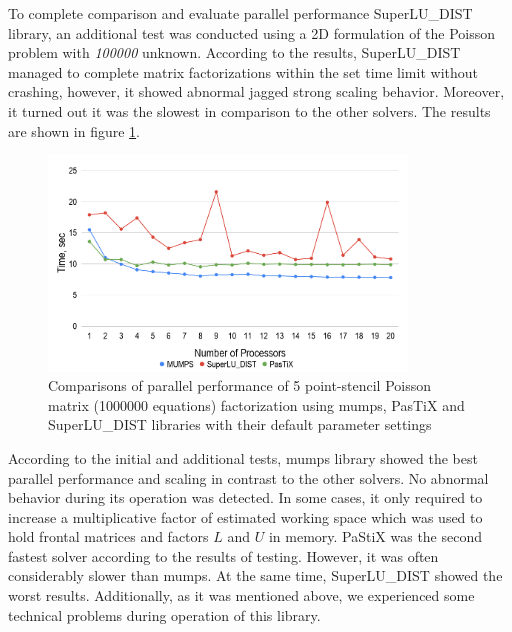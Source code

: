 
To complete comparison and evaluate parallel performance SuperLU\_DIST library, an additional test was conducted using a 2D formulation of the Poisson problem with \textit{100000} unknown. According to the results, SuperLU\_DIST managed to complete matrix factorizations within the set time limit without crashing, however, it showed abnormal jagged strong scaling behavior. Moreover, it turned out it was the slowest in comparison to the other solvers. The results are shown in figure \ref{fig:5-point-stencil-solvers-comparison}.\\



\figpointer{\ref{fig:5-point-stencil-solvers-comparison}}
\begin{figure}[htpb]
  \centering
  \includegraphics[width=0.85\textwidth]{figures/chapter-2/solvers-comparison-5-point-stencil.png}
\caption{Comparisons of parallel performance of 5 point-stencil Poisson matrix (1000000  equations) factorization using 
\acrshort{mumps}, PasTiX and SuperLU\_DIST libraries with their default parameter settings}
\label{fig:5-point-stencil-solvers-comparison}
\end{figure}


According to the initial and additional tests, \acrshort{mumps} library showed the best parallel performance and scaling in contrast to the other solvers. No abnormal behavior during its operation was detected. In some cases, it only required to increase a multiplicative factor of estimated working space which was used to hold frontal matrices and factors $L$ and $U$ in memory. PaStiX was the second fastest solver according to the results of testing. However,  it was often considerably slower than \acrshort{mumps}. At the same time, SuperLU\_DIST showed the worst results. Additionally, as it was mentioned above, we experienced some technical problems during operation of this library.\\


